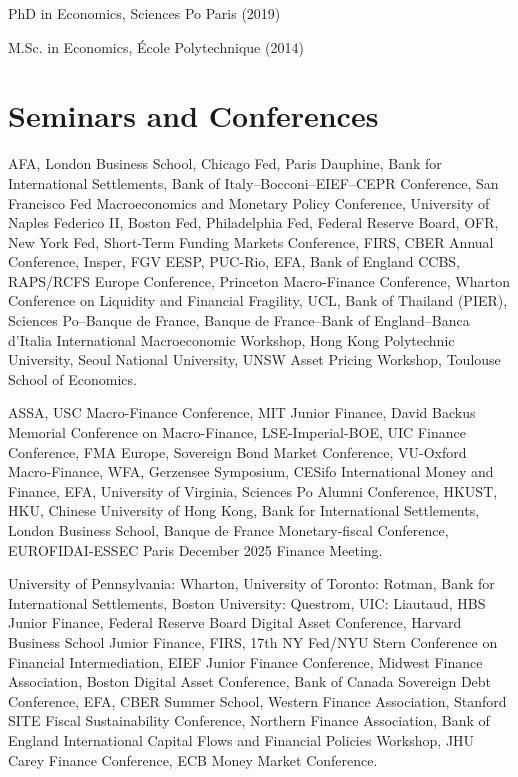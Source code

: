 \documentclass[11pt]{res} %
\begin{document}
\begin{resume}
PhD in Economics, Sciences Po Paris (2019)

M.Sc. in Economics, \'Ecole Polytechnique (2014)

\section{Seminars and Conferences} 
\vspace{8pt}

 AFA, London Business School, Chicago Fed, Paris Dauphine, Bank for International Settlements, Bank of Italy--Bocconi--EIEF--CEPR Conference, San Francisco Fed Macroeconomics and Monetary Policy Conference, University of Naples Federico II, Boston Fed, Philadelphia Fed, Federal Reserve Board, OFR, New York Fed, Short-Term Funding Markets Conference, FIRS, CBER Annual Conference, Insper, FGV EESP, PUC-Rio, EFA, Bank of England CCBS, RAPS/RCFS Europe Conference, Princeton Macro-Finance Conference, Wharton Conference on Liquidity and Financial Fragility, UCL, Bank of Thailand (PIER), Sciences Po--Banque de France, Banque de France--Bank of England--Banca d'Italia International Macroeconomic Workshop, Hong Kong Polytechnic University, Seoul National University, UNSW Asset Pricing Workshop, Toulouse School of Economics.

 ASSA, USC Macro-Finance Conference, MIT Junior Finance, David Backus Memorial Conference on Macro-Finance, LSE-Imperial-BOE, UIC Finance Conference, FMA Europe, Sovereign Bond Market Conference, VU-Oxford Macro-Finance, WFA, Gerzensee Symposium, CESifo International Money and Finance, EFA, University of Virginia, Sciences Po Alumni Conference, HKUST, HKU, Chinese University of Hong Kong, Bank for International Settlements, London Business School, Banque de France Monetary-fiscal Conference, EUROFIDAI-ESSEC Paris December 2025 Finance Meeting.

 University of Pennsylvania: Wharton, University of Toronto: Rotman, Bank for International Settlements, Boston University: Questrom, UIC: Liautaud, HBS Junior Finance, Federal Reserve Board Digital Asset Conference, Harvard Business School Junior Finance, FIRS, 17th NY Fed/NYU Stern Conference on Financial Intermediation, EIEF Junior Finance Conference, Midwest Finance Association, Boston Digital Asset Conference, Bank of Canada Sovereign Debt Conference, EFA, CBER Summer School, Western Finance Association, Stanford SITE Fiscal Sustainability Conference, Northern Finance Association, Bank of England International Capital Flows and Financial Policies Workshop, JHU Carey Finance Conference, ECB Money Market Conference.


\end{resume}
\end{document}
